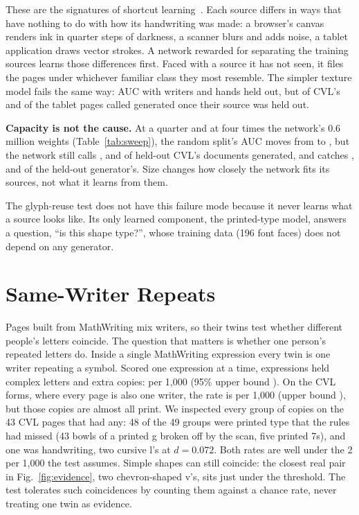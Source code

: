 \documentclass[conference]{IEEEtran}
\begin{document}
These are the signatures of shortcut learning~\cite{geirhos2020shortcut}. Each source differs in ways that have nothing
to do with how its handwriting was made: a browser's canvas renders ink in quarter steps of darkness, a scanner blurs and
adds noise, a tablet application draws vector strokes. A network rewarded for separating the training sources learns
those differences first. Faced with a source it has not seen, it files the pages under whichever familiar class they
most resemble. The simpler texture model fails the same way: AUC \TexAucNone{} with writers and hands held out, but
\TexHeldCvl{} of CVL's and \TexHeldIpad{} of the tablet pages called generated once their source was held out.


\textbf{Capacity is not the cause.} At a quarter and at four times the network's 0.6 million weights (Table~\ref{tab:sweep}), the random split's AUC moves from \SweepAucHalf{} to
\SweepAucTwo{}, but the network still calls \SweepCvlHalf{}, \SweepCvlOne{} and \SweepCvlTwo{} of held-out CVL's
documents generated, and catches \SweepScribeHalf{}, \SweepScribeOne{} and \SweepScribeTwo{} of the held-out
generator's. Size changes how closely the network fits its sources, not what it learns from them.

The glyph-reuse test does not have this failure mode because it never learns what a source looks like. Its only
learned component, the printed-type model, answers a question, ``is this shape type?'', whose training data (196 font
faces) does not depend on any generator.

\section{Same-Writer Repeats}
\label{sec:sameWriter}

Pages built from MathWriting mix writers, so their twins test whether different people's letters coincide. The
question that matters is whether one person's repeated letters do. Inside a single MathWriting expression every twin is
one writer repeating a symbol. Scored one expression at a time, \MwExpressions{} expressions held \MwComplex{} complex
letters and \MwCopies{} extra copies: \MwRate{} per 1{,}000 (95\% upper bound \MwUpper{}). On the CVL forms, where every
page is also one writer, the rate is \RateCvl{} per 1{,}000 (upper bound \UpperCvl{}), but those copies are almost
all print. We inspected every group of copies on the 43 CVL pages that had any: 48 of the 49 groups were printed type
that the rules had missed (43 bowls of a printed g broken off by the scan, five printed 7s), and one was handwriting,
two cursive l's at $d = 0.072$. Both rates are well under the 2 per 1{,}000 the test assumes. Simple shapes can still
coincide: the closest real pair in Fig.~\ref{fig:evidence}, two chevron-shaped v's, sits just under the threshold. The test tolerates such coincidences by counting them against a chance rate, never treating one
twin as evidence.
\end{document}
